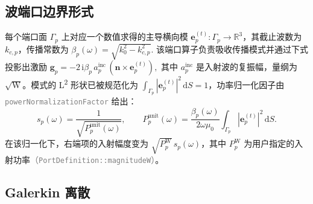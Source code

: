 \documentclass[11pt,a4paper]{ctexart}
\newcommand{\R}{\mathbb{R}}
\newcommand{\im}{\mathrm{i}}
\begin{document}
\subsection{波端口边界形式}

每个端口面 $\Gamma_p$ 上对应一个数值求得的主导横向模 $\bm e_p^{(t)}: \Gamma_p \to \R^3$，其截止波数为 $k_{c,p}$，传播常数为
\(
  \beta_p(\omega) = \sqrt{k_0^2 - k_{c,p}^2}.
\)
该端口算子负责吸收传播模式并通过下式投影出激励
\(
  \bm g_p = -2\,\im\beta_p\,a_p^{\mathrm{inc}}\,(\hat{\bm n}\times\bm e_p^{(t)}),
\)
其中 $a_p^{\mathrm{inc}}$ 是入射波的复振幅，量纲为 $\sqrt{\mathrm{W}}$。模式的 L\textsuperscript{2} 形状已被规范化为 $\int_{\Gamma_p} |\bm e_p^{(t)}|^2\,\mathrm dS = 1$，功率归一化因子由 \textcolor{gray}{\texttt{powerNormalizationFactor}} 给出：
\begin{equation}
  s_p(\omega) = \frac{1}{\sqrt{P_p^{\mathrm{unit}}(\omega)}}, \qquad
  P_p^{\mathrm{unit}}(\omega) = \frac{\beta_p(\omega)}{2\omega\mu_0}
  \int_{\Gamma_p}|\bm e_p^{(t)}|^2\,\mathrm dS.
  \label{eq:powernorm}
\end{equation}
在该归一化下，右端项的入射幅度变为 $\sqrt{P_p^{\mathrm W}}\,s_p(\omega)$，其中 $P_p^{\mathrm W}$ 为用户指定的入射功率\textcolor{gray}{（\texttt{PortDefinition::magnitudeW}）}。

\subsection{Galerkin 离散}
\end{document}
